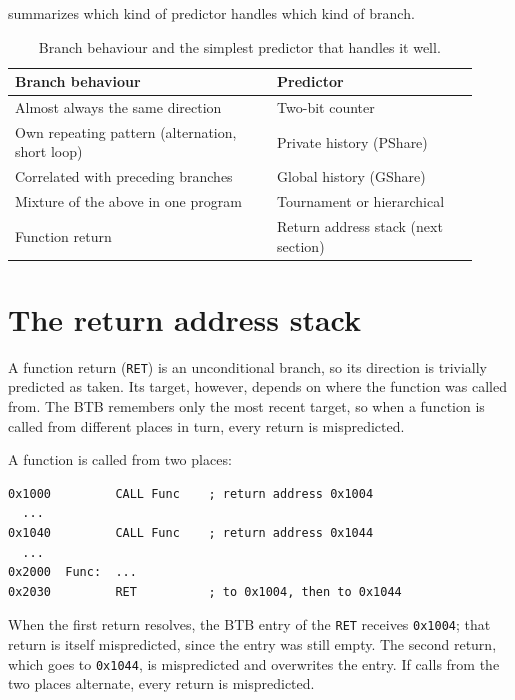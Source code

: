 \documentclass[../main.tex]{subfiles}
\begin{document}
 summarizes which kind of predictor handles which kind of
branch.

\begin{table}[htbp]
  \centering\small
  \caption{Branch behaviour and the simplest predictor that handles it well.}
  \label{tab:l04-which}
  \begin{tabular}{@{}p{0.52\linewidth}p{0.4\linewidth}@{}}
    \toprule
    Branch behaviour & Predictor \\
    \midrule
    Almost always the same direction & Two-bit counter \\
    Own repeating pattern (alternation, short loop) & Private history (PShare) \\
    Correlated with preceding branches & Global history (GShare) \\
    Mixture of the above in one program & Tournament or hierarchical \\
    Function return & Return address stack (next section) \\
    \bottomrule
  \end{tabular}
\end{table}

\section{The return address stack}
\label{sec:l04-ras}

A function return (\texttt{RET}) is an unconditional branch, so its direction
is trivially predicted as taken.  Its target, however, depends on where the function was
called from.  The BTB remembers only the most recent target, so when a
function is called from different places in turn, every return is
mispredicted.

\begin{example}
  A function is called from two places:
  \begin{lstlisting}[language={[x86masm]Assembler}, numbers=none]
0x1000         CALL Func    ; return address 0x1004
  ...
0x1040         CALL Func    ; return address 0x1044
  ...
0x2000  Func:  ...
0x2030         RET          ; to 0x1004, then to 0x1044
\end{lstlisting}
  When the first return resolves, the BTB entry of the \texttt{RET}
  receives \texttt{0x1004}; that return is itself mispredicted, since the
  entry was still empty.  The second return, which goes to \texttt{0x1044},
  is mispredicted and overwrites the entry.  If calls from the two places
  alternate, every return is mispredicted.
\end{example}
\end{document}
